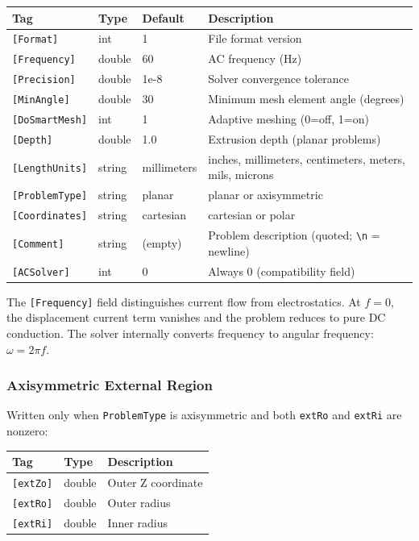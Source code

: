 \documentclass[11pt]{article}
\begin{document}
\begin{longtable}{lllp{5.5cm}}
\toprule
Tag & Type & Default & Description \\
\midrule
\endhead
\verb|[Format]|      & int     & 1          & File format version \\
\verb|[Frequency]|   & double  & 60         & AC frequency (Hz) \\
\verb|[Precision]|   & double  & 1e-8       & Solver convergence tolerance \\
\verb|[MinAngle]|    & double  & 30         & Minimum mesh element angle (degrees) \\
\verb|[DoSmartMesh]| & int     & 1          & Adaptive meshing (0=off, 1=on) \\
\verb|[Depth]|       & double  & 1.0        & Extrusion depth (planar problems) \\
\verb|[LengthUnits]| & string  & millimeters & inches, millimeters, centimeters, meters, mils, microns \\
\verb|[ProblemType]| & string  & planar     & planar or axisymmetric \\
\verb|[Coordinates]| & string  & cartesian  & cartesian or polar \\
\verb|[Comment]|     & string  & (empty)    & Problem description (quoted; \verb|\n| = newline) \\
\verb|[ACSolver]|    & int     & 0          & Always 0 (compatibility field) \\
\bottomrule
\end{longtable}

The \verb|[Frequency]| field distinguishes current flow from
electrostatics.  At $f = 0$, the displacement current term vanishes
and the problem reduces to pure DC conduction.  The solver internally
converts frequency to angular frequency: $\omega = 2\pi f$.

\subsubsection{Axisymmetric External Region}

Written only when \verb|ProblemType| is axisymmetric and both
\verb|extRo| and \verb|extRi| are nonzero:

\begin{longtable}{llp{8cm}}
\toprule
Tag & Type & Description \\
\midrule
\verb|[extZo]| & double & Outer Z coordinate \\
\verb|[extRo]| & double & Outer radius \\
\verb|[extRi]| & double & Inner radius \\
\bottomrule
\end{longtable}
\end{document}
